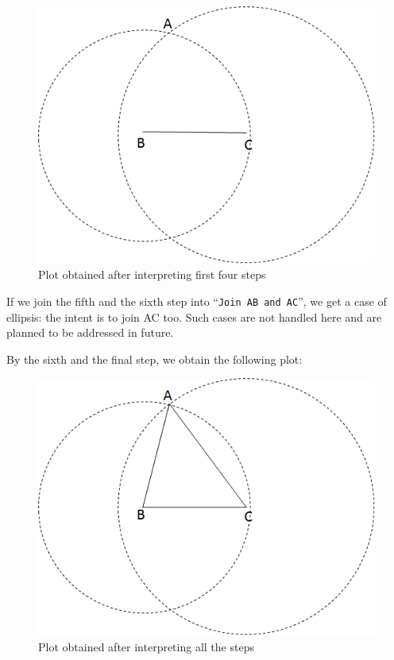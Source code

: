 \def\DevnagVersion{2.15}\documentclass[12pt]{article}
\begin{document}
\begin{figure}[H]
  \begin{center}
    \includegraphics[scale=0.5]{step4.png}
  \end{center}
  \caption{Plot obtained after interpreting first four steps}
  \label{}
\end{figure}

If we join the fifth and the sixth step into ``\texttt{Join AB and AC}'', we get a case of ellipsis: the intent is to join AC too. Such cases are not handled here and are planned to be addressed in future.

By the sixth and the final step, we obtain the following plot:

\begin{figure}[H]
  \begin{center}
    \includegraphics[scale=0.5]{step6.png}
  \end{center}
  \caption{Plot obtained after interpreting all the steps}
  \label{}
\end{figure}
\end{document}
